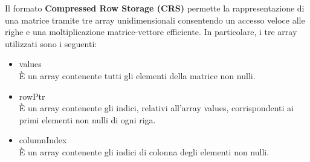 Il formato \textbf{Compressed Row Storage (CRS)} permette la rappresentazione di una matrice tramite tre array unidimensionali consentendo un accesso veloce alle righe e una moltiplicazione matrice-vettore efficiente. In particolare, i tre array utilizzati sono i seguenti:
\begin{itemize}
	\item values\\
	È un array contenente tutti gli elementi della matrice non nulli.
	\item rowPtr\\
	È un array contenente gli indici, relativi all'array values, corrispondenti ai primi elementi non nulli di ogni riga.
	\item columnIndex\\
	È un array contenente gli indici di colonna degli elementi non nulli.
\end{itemize}